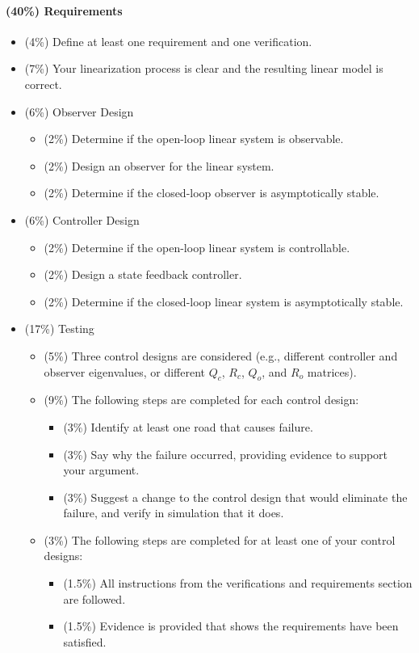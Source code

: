 \documentclass[12pt]{article}
\begin{document}
\paragraph{(40\%) Requirements}
\begin{itemize}

\item (4\%) Define at least one requirement and one verification.

\item (7\%) Your linearization process is clear and the resulting linear model is correct.

\item (6\%) Observer Design
\begin{itemize}
\item (2\%) Determine if the open-loop linear system is observable.
\item (2\%) Design an observer for the linear system.
\item (2\%) Determine if the closed-loop observer is asymptotically stable.
\end{itemize}

\item (6\%) Controller Design
\begin{itemize}
\item (2\%) Determine if the open-loop linear system is controllable.
\item (2\%) Design a state feedback controller.
\item (2\%) Determine if the closed-loop linear system is asymptotically stable.
\end{itemize}

\item (17\%) Testing
\begin{itemize}
\item (5\%) Three control designs are considered (e.g., different controller and observer eigenvalues, or different $Q_c$, $R_c$, $Q_o$, and $R_o$ matrices).
\item (9\%) The following steps are completed for each control design:
\begin{itemize}
  \item (3\%) Identify at least one road that causes failure.
  \item (3\%) Say why the failure occurred, providing evidence to support your argument.
  \item (3\%) Suggest a change to the control design that would eliminate the failure, and verify in simulation that it does.
\end{itemize}
\item (3\%) The following steps are completed for at least one of your control designs:
\begin{itemize}
  \item (1.5\%) All instructions from the verifications and requirements section are followed.
  \item (1.5\%) Evidence is provided that shows the requirements have been satisfied.
\end{itemize}


\end{itemize}

\end{itemize}
\end{document}
